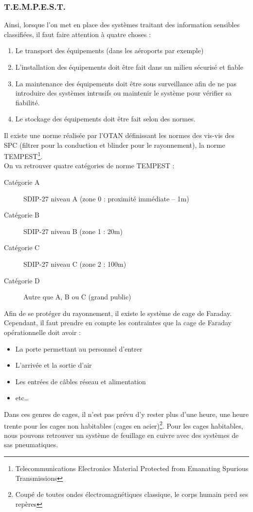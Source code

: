 \subsubsection{T.E.M.P.E.S.T.}
Ainsi, lorsque l'on met en place des systèmes traitant des information sensibles classifiées, il faut faire attention à quatre choses :
\begin{enumerate}
 \item Le transport des équipements (dans les aéroports par exemple)
 \item L'installation des équipements doit être fait dans un milieu sécurisé et fiable
 \item La maintenance des équipements doit être sous surveillance afin de ne pas introduire des systèmes intrusifs ou maintenir le système pour vérifier sa fiabilité.
 \item Le stockage des équipements doit être fait selon des normes.
\end{enumerate}
Il existe une norme réalisée par l'OTAN définissant les normes des vis-vis des SPC (filtrer pour la conduction et blinder pour le rayonnement), la norme TEMPEST\footnote{Telecommunications Electronics Material Protected from Emanating Spurious Transmissions}.\\
On va retrouver quatre catégories de norme TEMPEST :
\begin{description}
 \item[Catégorie A] SDIP-27 niveau A (zone 0 : proximité immédiate -- 1m)
 \item[Catégorie B] SDIP-27 niveau B (zone 1 : 20m)
 \item[Catégorie C] SDIP-27 niveau C (zone 2 : 100m)
 \item[Catégorie D] Autre que A, B ou C (grand public)
\end{description}
Afin de se protéger du rayonnement, il existe le système de cage de Faraday. Cependant, il faut prendre en compte les contraintes que la cage de Faraday opérationnelle doit avoir :
\begin{itemize}
 \item La porte permettant au personnel d'entrer
 \item L'arrivée et la sortie d'air
 \item Les entrées de câbles réseau et alimentation
 \item etc\ldots
\end{itemize}
Dans ces genres de cages, il n'est pas prévu d'y rester plus d'une heure, une heure trente pour les cages non habitables (cages en acier)\footnote{Coupé de toutes ondes électromagnétiques classique, le corps humain perd ses repères}. Pour les cages habitables, nous pouvons retrouver un système de feuillage en cuivre avec des systèmes de sas pneumatiques.\\

